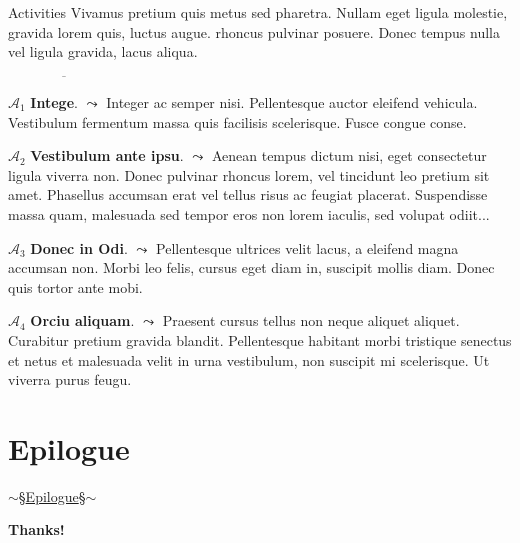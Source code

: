 \documentclass{beamer} %
\newcommand{\decoratetext}[1]{\marcellus $\sim$\;\S\quad\underline{#1}\quad\S\;$\sim$}
\begin{document}
\begin{frame}{Activities}
Vivamus pretium quis metus sed pharetra. Nullam eget ligula molestie, gravida lorem quis, luctus augue. rhoncus pulvinar posuere. Donec tempus nulla vel ligula gravida, lacus aliqua.

\begin{center}
$\overline{\hspace{8em}}$
\end{center}

$\mathcal{A}_1$ \; {\bf Intege}. $\leadsto$ 
Integer ac semper nisi. Pellentesque auctor eleifend vehicula. Vestibulum fermentum massa quis facilisis scelerisque. Fusce congue conse.

\vspace{0.5em}

$\mathcal{A}_2$ \; {\bf Vestibulum ante ipsu}. $\leadsto$ 
Aenean tempus dictum nisi, eget consectetur ligula viverra non. Donec pulvinar rhoncus lorem, vel tincidunt leo pretium sit amet. Phasellus accumsan erat vel tellus risus ac feugiat placerat. Suspendisse massa quam, malesuada sed tempor eros non lorem iaculis, sed volupat odiit...

\end{frame}


\begin{frame}

$\mathcal{A}_3$ \; {\bf Donec in Odi}. $\leadsto$ 
Pellentesque ultrices velit lacus, a eleifend magna accumsan non. Morbi leo felis, cursus eget diam in, suscipit mollis diam. Donec quis tortor ante mobi.

\vspace{0.5em}

$\mathcal{A}_4$ \; {\bf Orciu aliquam}. $\leadsto$ 
Praesent cursus tellus non neque aliquet aliquet. Curabitur pretium gravida blandit. Pellentesque habitant morbi tristique senectus et netus et malesuada velit in urna vestibulum, non suscipit mi scelerisque. Ut viverra purus feugu.

\end{frame}


\section{Epilogue}
\begin{frame}\begin{center}
\LARGE\decoratetext{Epilogue}
\end{center}\end{frame}

\begin{frame}[fragile]
\begin{center}
{\Huge\bf Thanks!}
\end{center}
\end{frame}
\end{document}

